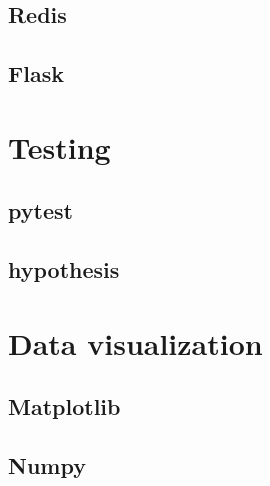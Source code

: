 \subsection{Redis}

\subsection{Flask}

\section{Testing}

\subsection{pytest}

\subsection{hypothesis}

\section{Data visualization}

\subsection{Matplotlib}

\subsection{Numpy}
